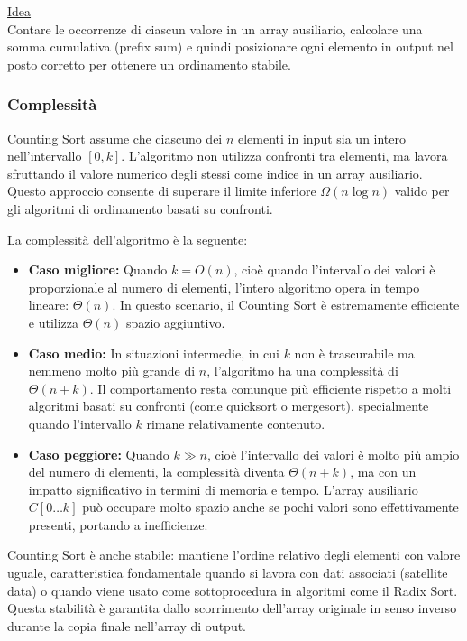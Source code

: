 \documentclass[a4paper, 11pt]{article}
\begin{document}
\noindent  \underline{Idea} \\ Contare le occorrenze di ciascun valore in un array ausiliario, calcolare una somma cumulativa (prefix sum) e quindi posizionare ogni elemento in output nel posto corretto per ottenere un ordinamento stabile.

\subsubsection*{Complessità}

\noindent Counting Sort assume che ciascuno dei \(n\) elementi in input sia un intero nell’intervallo \([0, k]\). L'algoritmo non utilizza confronti tra elementi, ma lavora sfruttando il valore numerico degli stessi come indice in un array ausiliario. Questo approccio consente di superare il limite inferiore \(\Omega(n \log n)\) valido per gli algoritmi di ordinamento basati su confronti.

\noindent La complessità dell’algoritmo è la seguente:

\begin{itemize}
  \item \textbf{Caso migliore:} Quando \(k = O(n)\), cioè quando l’intervallo dei valori è proporzionale al numero di elementi, l’intero algoritmo opera in tempo lineare: \(\Theta(n)\). In questo scenario, il Counting Sort è estremamente efficiente e utilizza \(\Theta(n)\) spazio aggiuntivo.
  
  \item \textbf{Caso medio:} In situazioni intermedie, in cui \(k\) non è trascurabile ma nemmeno molto più grande di \(n\), l'algoritmo ha una complessità di \(\Theta(n + k)\). Il comportamento resta comunque più efficiente rispetto a molti algoritmi basati su confronti (come quicksort o mergesort), specialmente quando l’intervallo \(k\) rimane relativamente contenuto.

  \item \textbf{Caso peggiore:} Quando \(k \gg n\), cioè l’intervallo dei valori è molto più ampio del numero di elementi, la complessità diventa \(\Theta(n + k)\), ma con un impatto significativo in termini di memoria e tempo. L’array ausiliario \(C[0 \dots k]\) può occupare molto spazio anche se pochi valori sono effettivamente presenti, portando a inefficienze.

\end{itemize}

\noindent Counting Sort è anche stabile: mantiene l’ordine relativo degli elementi con valore uguale, caratteristica fondamentale quando si lavora con dati associati (satellite data) o quando viene usato come sottoprocedura in algoritmi come il Radix Sort. \\
Questa stabilità è garantita dallo scorrimento dell’array originale in senso inverso durante la copia finale nell’array di output.
\end{document}
